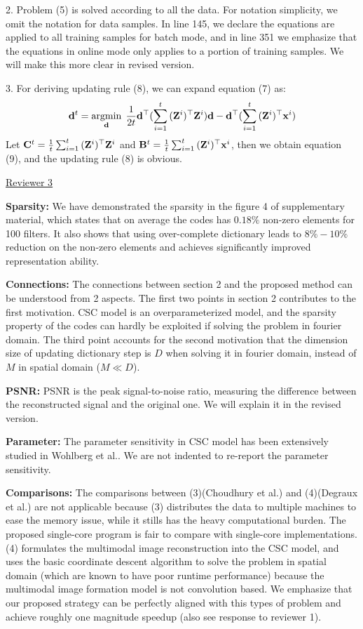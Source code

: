 \documentclass[10pt,twocolumn,letterpaper]{article}
\begin{document}
2. Problem (5) is solved according to all the data. For notation simplicity, we omit the notation for data samples. In line 145, we declare the equations are applied to all training samples for batch mode, and in line 351 we emphasize that the equations in online mode only applies to a portion of training samples. We will make this more clear in revised version.

3. For deriving updating rule (8), we can expand equation (7) as:
\begin{equation}
    \filter^t = \minimize{\filter} \frac{1}{2t} \filter^{\top} (\sum_{i=1}^{t}{(\Code^i)^{\top}\Code^i})\filter - \filter^{\top} (\sum_{i=1}^{t}{(\Code^i)^{\top}\signal^i})
\end{equation}
Let $\surC^t = \frac{1}{t}\sum_{i=1}^{t}{(\Code^i)^{\top}\Code^i}$ and $\surB^t = \frac{1}{t} \sum_{i=1}^{t}{(\Code^i)^{\top}\signal^i}$, then we obtain equation (9), and the updating rule (8) is obvious.

\underline{Reviewer 3}

\textbf{Sparsity:}
We have demonstrated the sparsity in the figure 4 of supplementary material, which states that on average the codes has $0.18\%$ non-zero elements for 100 filters. It also shows that using over-complete dictionary leads to $8\% - 10\%$ reduction on the non-zero elements and achieves significantly improved representation ability. 

\textbf{Connections:}
The connections between section 2 and the proposed method can be understood from 2 aspects. The first two points in section 2 contributes to the first motivation. CSC model is an overparameterized model, and the sparsity property of the codes can hardly be exploited if solving the problem in fourier domain. The third point accounts for the second motivation that the dimension size of updating dictionary step is $D$ when solving it in fourier domain, instead of $M$ in spatial domain ($M \ll D$).

\textbf{PSNR:}
PSNR is the peak signal-to-noise ratio, measuring the difference between the reconstructed signal and the original one. We will explain it in the revised version.

\textbf{Parameter:}
The parameter sensitivity in CSC model has been extensively studied in Wohlberg et al.. We are not indented to re-report the parameter sensitivity.

\textbf{Comparisons:}
The comparisons between (3)(Choudhury et al.) and (4)(Degraux et al.) are not applicable because (3) distributes the data to multiple machines to ease the memory issue, while it stills has the heavy computational burden. The proposed single-core program is fair to compare with single-core implementations. (4) formulates the multimodal image reconstruction into the CSC model, and uses the basic coordinate descent algorithm to solve the problem in spatial domain (which are known to have poor runtime performance) because the multimodal image formation model is not convolution based. We emphasize that our proposed strategy can be perfectly aligned with this types of problem and achieve roughly one magnitude speedup (also see response to reviewer 1).
\end{document}
